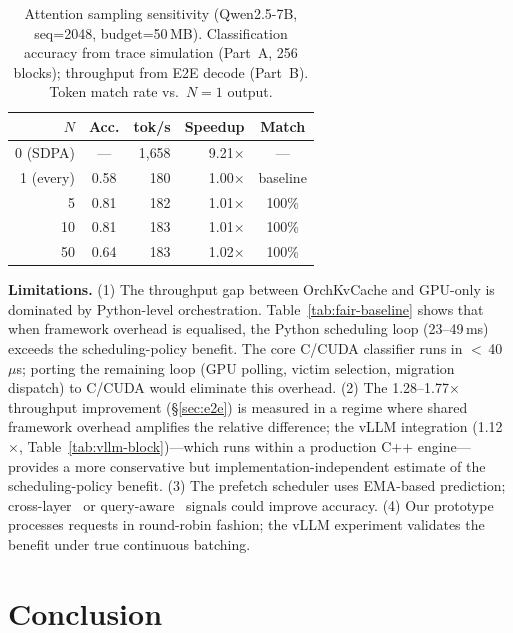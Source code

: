 \documentclass[conference]{IEEEtran}
\begin{document}
\begin{table}[t]
\centering
\caption{Attention sampling sensitivity (Qwen2.5-7B, seq=2048, budget=50\,MB). Classification accuracy from trace simulation (Part~A, 256 blocks); throughput from E2E decode (Part~B). Token match rate vs.\ $N{=}1$ output.}
\label{tab:sampling}
\footnotesize
\setlength{\tabcolsep}{10pt}
\begin{tabular}{@{}rcrrc@{}}
\toprule
$N$ & Acc. & tok/s & Speedup & Match \\
\midrule
0 (SDPA) & --- & 1{,}658 & 9.21$\times$ & --- \\
1 (every) & 0.58 & 180 & 1.00$\times$ & baseline \\
5 & 0.81 & 182 & 1.01$\times$ & 100\% \\
10 & 0.81 & 183 & 1.01$\times$ & 100\% \\
50 & 0.64 & 183 & 1.02$\times$ & 100\% \\
\bottomrule
\end{tabular}
\end{table}

\textbf{Limitations.} (1) The throughput gap between OrchKvCache and GPU-only is dominated by Python-level orchestration.  Table~\ref{tab:fair-baseline} shows that when framework overhead is equalised, the Python scheduling loop (23--49\,ms) exceeds the scheduling-policy benefit.  The core C/CUDA classifier runs in $<$\,40\,$\mu$s; porting the remaining loop (GPU polling, victim selection, migration dispatch) to C/CUDA would eliminate this overhead.  (2) The 1.28--1.77$\times$ throughput improvement (\S\ref{sec:e2e}) is measured in a regime where shared framework overhead amplifies the relative difference; the vLLM integration (1.12$\times$, Table~\ref{tab:vllm-block})---which runs within a production C++ engine---provides a more conservative but implementation-independent estimate of the scheduling-policy benefit.  (3) The prefetch scheduler uses EMA-based prediction; cross-layer~\cite{infinigen} or query-aware~\cite{quest} signals could improve accuracy.  (4) Our prototype processes requests in round-robin fashion; the vLLM experiment validates the benefit under true continuous batching.

\section{Conclusion}
\end{document}
